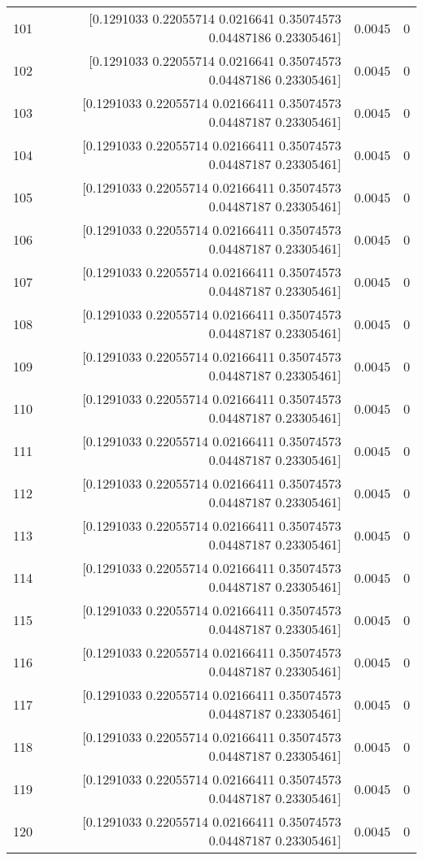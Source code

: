 \begin{longtable}{lrrr}
101 & [0.1291033  0.22055714 0.0216641  0.35074573 0.04487186 0.23305461] & 0.0045 & 0 \\
102 & [0.1291033  0.22055714 0.0216641  0.35074573 0.04487186 0.23305461] & 0.0045 & 0 \\
103 & [0.1291033  0.22055714 0.02166411 0.35074573 0.04487187 0.23305461] & 0.0045 & 0 \\
104 & [0.1291033  0.22055714 0.02166411 0.35074573 0.04487187 0.23305461] & 0.0045 & 0 \\
105 & [0.1291033  0.22055714 0.02166411 0.35074573 0.04487187 0.23305461] & 0.0045 & 0 \\
106 & [0.1291033  0.22055714 0.02166411 0.35074573 0.04487187 0.23305461] & 0.0045 & 0 \\
107 & [0.1291033  0.22055714 0.02166411 0.35074573 0.04487187 0.23305461] & 0.0045 & 0 \\
108 & [0.1291033  0.22055714 0.02166411 0.35074573 0.04487187 0.23305461] & 0.0045 & 0 \\
109 & [0.1291033  0.22055714 0.02166411 0.35074573 0.04487187 0.23305461] & 0.0045 & 0 \\
110 & [0.1291033  0.22055714 0.02166411 0.35074573 0.04487187 0.23305461] & 0.0045 & 0 \\
111 & [0.1291033  0.22055714 0.02166411 0.35074573 0.04487187 0.23305461] & 0.0045 & 0 \\
112 & [0.1291033  0.22055714 0.02166411 0.35074573 0.04487187 0.23305461] & 0.0045 & 0 \\
113 & [0.1291033  0.22055714 0.02166411 0.35074573 0.04487187 0.23305461] & 0.0045 & 0 \\
114 & [0.1291033  0.22055714 0.02166411 0.35074573 0.04487187 0.23305461] & 0.0045 & 0 \\
115 & [0.1291033  0.22055714 0.02166411 0.35074573 0.04487187 0.23305461] & 0.0045 & 0 \\
116 & [0.1291033  0.22055714 0.02166411 0.35074573 0.04487187 0.23305461] & 0.0045 & 0 \\
117 & [0.1291033  0.22055714 0.02166411 0.35074573 0.04487187 0.23305461] & 0.0045 & 0 \\
118 & [0.1291033  0.22055714 0.02166411 0.35074573 0.04487187 0.23305461] & 0.0045 & 0 \\
119 & [0.1291033  0.22055714 0.02166411 0.35074573 0.04487187 0.23305461] & 0.0045 & 0 \\
120 & [0.1291033  0.22055714 0.02166411 0.35074573 0.04487187 0.23305461] & 0.0045 & 0 \\

\end{longtable}
